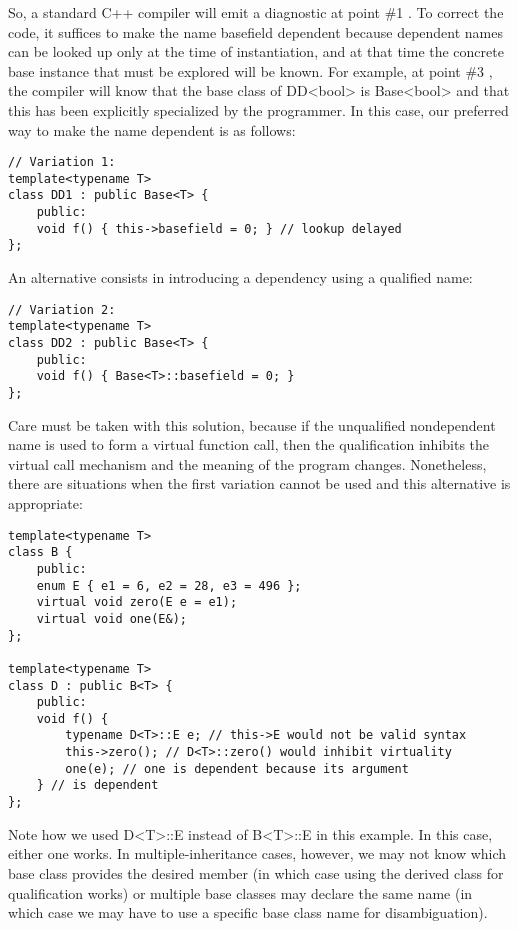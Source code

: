So, a standard C++ compiler will emit a diagnostic at point \#1 . To correct the code, it suffices to make the name basefield dependent because dependent names can be looked up only at the time of instantiation, and at that time the concrete base instance that must be explored will be known. For example, at point \#3 , the compiler will know that the base class of DD<bool> is Base<bool> and that this has been explicitly specialized by the programmer. In this case, our preferred way to make the name dependent is as follows:

\begin{lstlisting}[style=styleCXX]
// Variation 1:
template<typename T>
class DD1 : public Base<T> {
	public:
	void f() { this->basefield = 0; } // lookup delayed
};
\end{lstlisting}

An alternative consists in introducing a dependency using a qualified name:

\begin{lstlisting}[style=styleCXX]
// Variation 2:
template<typename T>
class DD2 : public Base<T> {
	public:
	void f() { Base<T>::basefield = 0; }
};
\end{lstlisting}

Care must be taken with this solution, because if the unqualified nondependent name is used to form a virtual function call, then the qualification inhibits the virtual call mechanism and the meaning of the program changes. Nonetheless, there are situations when the first variation cannot be used and this alternative is appropriate:

\begin{lstlisting}[style=styleCXX]
template<typename T>
class B {
	public:
	enum E { e1 = 6, e2 = 28, e3 = 496 };
	virtual void zero(E e = e1);
	virtual void one(E&);
};

template<typename T>
class D : public B<T> {
	public:
	void f() {
		typename D<T>::E e; // this->E would not be valid syntax
		this->zero(); // D<T>::zero() would inhibit virtuality
		one(e); // one is dependent because its argument
	} // is dependent
};
\end{lstlisting}

Note how we used D<T>::E instead of B<T>::E in this example. In this case, either one works. In multiple-inheritance cases, however, we may not know which base class provides the desired member (in which case using the derived class for qualification works) or multiple base classes may declare the same name (in which case we may have to use a specific base class name for disambiguation).

